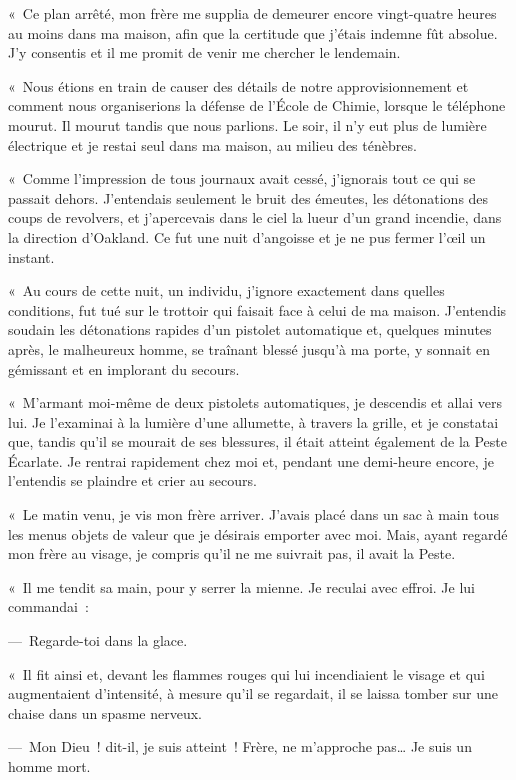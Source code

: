 \documentclass[french,twoside]{book} %
\begin{document}
« Ce plan arrêté, mon frère me supplia de demeurer encore vingt-quatre heures au moins dans ma maison, afin que la certitude que j’étais indemne fût absolue. J’y consentis et il me promit de venir me chercher le lendemain.\par
« Nous étions en train de causer des détails de notre approvisionnement et comment nous organiserions la défense de l’École de Chimie, lorsque le téléphone mourut. Il mourut tandis que nous parlions. Le soir, il n’y eut plus de lumière électrique et je restai seul dans ma maison, au milieu des ténèbres.\par
« Comme l’impression de tous journaux avait cessé, j’ignorais tout ce qui se passait dehors. J’entendais seulement le bruit des émeutes, les détonations des coups de revolvers, et j’apercevais dans le ciel la lueur d’un grand incendie, dans la direction d’Oakland. Ce fut une nuit d’angoisse et je ne pus fermer l’œil un instant.\par
« Au cours de cette nuit, un individu, j’ignore exactement dans quelles conditions, fut tué sur le trottoir qui faisait face à celui de ma maison. J’entendis soudain les détonations rapides d’un pistolet automatique et, quelques minutes après, le malheureux homme, se traînant blessé jusqu’à ma porte, y sonnait en gémissant et en implorant du secours.\par
« M’armant moi-même de deux pistolets automatiques, je descendis et allai vers lui. Je l’examinai à la lumière d’une allumette, à travers la grille, et je constatai que, tandis qu’il se mourait de ses blessures, il était atteint également de la Peste Écarlate. Je rentrai rapidement chez moi et, pendant une demi-heure encore, je l’entendis se plaindre et crier au secours.\par
« Le matin venu, je vis mon frère arriver. J’avais placé dans un sac à main tous les menus objets de valeur que je désirais emporter avec moi. Mais, ayant regardé mon frère au visage, je compris qu’il ne me suivrait pas, il avait la Peste.\par
« Il me tendit sa main, pour y serrer la mienne. Je reculai avec effroi. Je lui commandai :\par
— Regarde-toi dans la glace.\par
« Il fit ainsi et, devant les flammes rouges qui lui incendiaient le visage et qui augmentaient d’intensité, à mesure qu’il se regardait, il se laissa tomber sur une chaise dans un spasme nerveux.\par
— Mon Dieu ! dit-il, je suis atteint ! Frère, ne m’approche pas… Je suis un homme mort.\par
\end{document}
